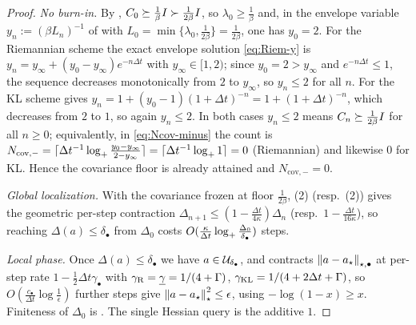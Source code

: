 \begin{proof}
\emph{No burn-in.} By , $C_0\succeq\tfrac1\beta I\succ\tfrac1{2\beta}I$, so
$\lambda_0\geq\tfrac1\beta$ and, in the envelope variable $y_n:=(\beta L_n)^{-1}$ of
 with $L_0=\min\{\lambda_0,\tfrac1{2\beta}\}=\tfrac1{2\beta}$, one has
$y_0=2$. For the Riemannian scheme the exact envelope solution \eqref{eq:Riem-y} is
$y_n=y_\infty+(y_0-y_\infty)e^{-n\Delta t}$ with $y_\infty\in[1,2)$; since $y_0=2>y_\infty$ and
$e^{-n\Delta t}\leq1$, the sequence decreases monotonically from $2$ to $y_\infty$, so $y_n\leq2$ for
all $n$. For the KL scheme  gives $y_n=1+(y_0-1)(1+\Delta t)^{-n}=1+(1+\Delta t)^{-n}$,
which decreases from $2$ to $1$, so again $y_n\leq2$. In both cases $y_n\leq2$ means
$C_n\succeq\tfrac1{2\beta}I$ for all $n\geq0$; equivalently, in \eqref{eq:Ncov-minus} the count is
$N_{\mathrm{cov},-}=\lceil\Delta t^{-1}\log_+\tfrac{y_0-y_\infty}{2-y_\infty}\rceil=\lceil\Delta t^{-1}\log_+1\rceil=0$
(Riemannian) and likewise $0$ for KL. Hence the covariance floor is already attained and
$N_{\mathrm{cov},-}=0$.

\emph{Global localization.} With the covariance frozen at floor $\tfrac1{2\beta}$,
(2) (resp.\ (2)) gives the geometric per-step contraction
$\Delta_{n+1}\leq(1-\tfrac{\Delta t}{4\kappa})\Delta_n$ (resp.\ $1-\tfrac{\Delta t}{16\kappa}$), so
reaching $\Delta(a)\leq\delta_\bullet$ from $\Delta_0$ costs
$O(\tfrac\kappa{\Delta t}\log_+\tfrac{\Delta_0}{\delta_\bullet})$ steps.

\emph{Local phase.} Once $\Delta(a)\leq\delta_\bullet$ we have $a\in\mathcal{U}_{\delta_\bullet}$, and
 contracts $\left\lVert a-a_\star\right\rVert_{\star,\bullet}$ at per-step rate
$1-\tfrac12\Delta t\gamma_\bullet$ with $\gamma_{\mathrm{R}}=\underline{\gamma}=1/(4+\Gamma)$,
$\gamma_{\mathrm{KL}}=1/(4+2\Delta t+\Gamma)$, so $O(\tfrac{c_\bullet}{\Delta t}\log\tfrac1\epsilon)$ further
steps give $\left\lVert a-a_\star\right\rVert_\star^2\leq\epsilon$, using $-\log(1-x)\geq x$. Finiteness of $\Delta_0$
is . The single Hessian query is the additive $1$.
\end{proof}

